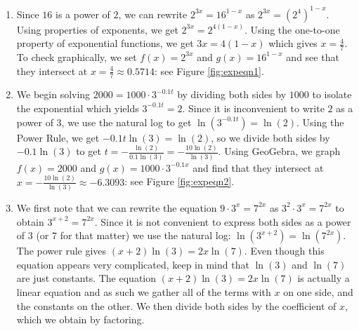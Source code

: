 {
\begin{enumerate}

\item  Since $16$ is a power of $2$, we can rewrite  $2^{3x} =  16^{1-x}$ as $2^{3x} = \left(2^4\right)^{1-x}$.  Using properties of exponents, we get $2^{3x} = 2^{4(1-x)}$.  Using the one-to-one property of exponential functions, we get $3x = 4(1-x)$ which gives $x=\frac{4}{7}$. To check graphically, we set $f(x) = 2^{3x}$ and $g(x) = 16^{1-x}$ and see that they intersect at $x=\frac{4}{7} \approx 0.5714$: see Figure \ref{fig:expeqn1}.

{}


\item  We begin solving $2000 = 1000 \cdot 3^{-0.1 t}$  by dividing both sides by $1000$ to isolate the exponential which yields $3^{-0.1t} = 2$.  Since it is inconvenient to write $2$ as a power of $3$, we use the natural log to get $\ln\left(3^{-0.1t}\right) = \ln(2)$.  Using the Power Rule, we get $-0.1 t \ln(3) = \ln(2)$, so we divide both sides by $-0.1 \ln(3)$ to get $t = -\frac{\ln(2)}{0.1 \ln(3)} = -\frac{10\ln(2)}{\ln(3)}$.  Using GeoGebra, we graph $f(x) = 2000$ and $g(x) =  1000 \cdot 3^{-0.1 x}$ and find that they intersect at $x = -\frac{10\ln(2)}{\ln(3)} \approx -6.3093$: see Figure \ref{fig:expeqn2}.

{}

\item  We first note that we can rewrite the equation $9 \cdot 3^{x} = 7^{2x}$ as $3^2 \cdot 3^x = 7^{2x}$ to obtain $3^{x+2} = 7^{2x}$.  Since it is not convenient to express both sides as a power of $3$ (or $7$ for that matter) we use the natural log:  $\ln\left(3^{x+2}\right) = \ln\left(7^{2x}\right)$.  The power rule gives $(x+2) \ln(3) = 2x \ln(7)$.  Even though this equation appears very complicated, keep in mind that $\ln(3)$ and $\ln(7)$ are just constants.  The equation $(x+2) \ln(3) = 2x \ln(7)$ is actually a linear equation and as such we gather all of the terms with $x$ on one side, and the constants on the other.  We then divide both sides by the coefficient of $x$, which we obtain by factoring.


\end{enumerate}}
